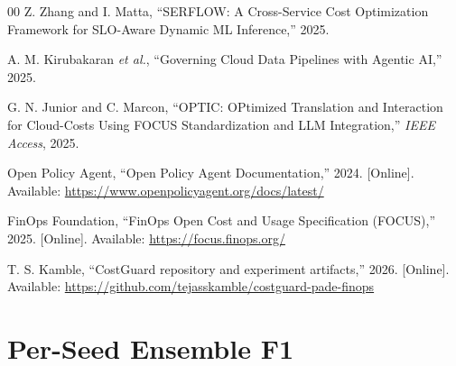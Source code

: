 \documentclass[10pt,twocolumn]{article}
\begin{document}
\begin{thebibliography}{00}
Z. Zhang and I. Matta, ``SERFLOW: A Cross-Service Cost Optimization Framework for SLO-Aware Dynamic ML Inference,'' 2025.

A. M. Kirubakaran \emph{et al.}, ``Governing Cloud Data Pipelines with Agentic AI,'' 2025.

G. N. Junior and C. Marcon, ``OPTIC: OPtimized Translation and Interaction for Cloud-Costs Using FOCUS Standardization and LLM Integration,'' \emph{IEEE Access}, 2025.

Open Policy Agent, ``Open Policy Agent Documentation,'' 2024. [Online]. Available: \url{https://www.openpolicyagent.org/docs/latest/}

FinOps Foundation, ``FinOps Open Cost and Usage Specification (FOCUS),'' 2025. [Online]. Available: \url{https://focus.finops.org/}

T. S. Kamble, ``CostGuard repository and experiment artifacts,'' 2026. [Online]. Available: \url{https://github.com/tejasskamble/costguard-pade-finops}
\end{thebibliography}
\endgroup

\clearpage
\onecolumn
\appendix

\FloatBarrier
\section{Per-Seed Ensemble F1}
\begin{table}[H]
\centering
\caption{Per-seed ensemble F1 values used in aggregate analysis.}
\label{tab:perseed}
\end{table}
\end{document}
